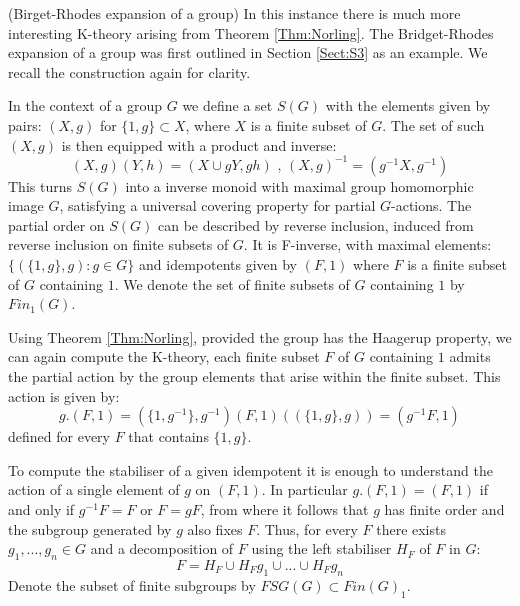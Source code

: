 \begin{example}(Birget-Rhodes expansion of a group)
In this instance there is much more interesting K-theory arising from Theorem \ref{Thm:Norling}. The Bridget-Rhodes expansion of a group \cite{MR745358,MR2221438} was first outlined in Section \ref{Sect:S3} as an example. We recall the construction again for clarity.

In the context of a group $G$ we define a set $S(G)$ with the elements given by pairs: $(X,g)$ for $\lbrace 1,g\rbrace \subset X$, where $X$ is a finite subset of $G$. The set of such $(X,g)$ is then equipped with a product and inverse:
\begin{equation*}
(X,g)(Y,h) = (X\cup gY,gh)\mbox{ , } (X,g)^{-1}=(g^{-1}X,g^{-1})
\end{equation*}
This turns $S(G)$ into a inverse monoid with maximal group homomorphic image $G$, satisfying a universal covering property for partial $G$-actions. The partial order on $S(G)$ can be described by reverse inclusion, induced from reverse inclusion on finite subsets of $G$. It is F-inverse, with maximal elements: $\lbrace(\lbrace 1,g \rbrace, g):g \in G \rbrace$ and idempotents given by $(F,1)$ where $F$ is a finite subset of $G$ containing $1$. We denote the set of finite subsets of $G$ containing $1$ by $Fin_{1}(G)$.

Using Theorem \ref{Thm:Norling}, provided the group has the Haagerup property, we can again compute the K-theory, each finite subset $F$ of $G$ containing $1$ admits the partial action by the group elements that arise within the finite subset. This action is given by:
\begin{equation*}
g. (F,1) = (\lbrace 1,g^{-1} \rbrace, g^{-1})(F,1)((\lbrace 1,g \rbrace, g)) = (g^{-1}F,1)
\end{equation*}
defined for every $F$ that contains $\lbrace 1,g \rbrace$.

To compute the stabiliser of a given idempotent it is enough to understand the action of a single element of $g$ on $(F,1)$. In particular $g.(F,1) = (F,1)$ if and only if $g^{-1}F=F$ or $F=gF$, from where it follows that $g$ has finite order and the subgroup generated by $g$ also fixes $F$. Thus, for every $F$ there exists $g_{1},...,g_{n} \in G$ and a decomposition of $F$ using the left stabiliser $H_{F}$ of $F$ in $G$:
\begin{equation*}
F= H_{F}\cup H_{F}g_{1}\cup ... \cup H_{F}g_{n}
\end{equation*}
Denote the subset of finite subgroups by $FSG(G)\subset Fin(G)_{1}$. 


\end{example}
